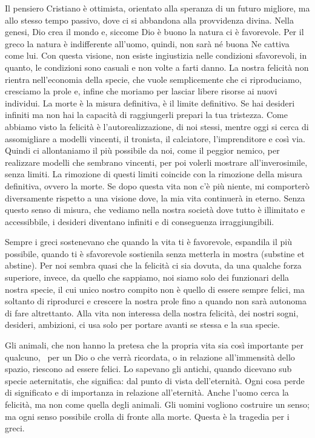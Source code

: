 \documentclass[12pt]{book} %
\begin{document}
Il pensiero Cristiano è ottimista, orientato alla speranza di un futuro migliore, ma allo stesso tempo passivo, dove ci
si abbandona alla provvidenza divina. Nella genesi, Dio crea il mondo e, siccome Dio è buono la natura ci è favorevole.
Per il greco la natura è indifferente all'uomo, quindi, non sarà né buona Ne cattiva come lui. Con questa visione, non
esiste ingiustizia nelle condizioni sfavorevoli, in quanto, le condizioni sono casuali e non volte a farti danno. La
nostra felicità non rientra nell'economia della specie, che vuole semplicemente che ci riproduciamo, cresciamo la prole
e, infine che moriamo per lasciar libere risorse ai nuovi individui. La morte è la misura definitiva, è il limite
definitivo. Se hai desideri infiniti ma non hai la capacità di raggiungerli prepari la tua tristezza. Come abbiamo
visto la felicità è l'autorealizzazione, di noi stessi, mentre oggi si cerca di assomigliare a
modelli vincenti, il tronista, il calciatore, l'imprenditore e così via. Quindi ci allontaniamo il
più possibile da noi, come il peggior nemico, per realizzare modelli che sembrano vincenti, per poi volerli mostrare
all'inverosimile, senza limiti. La rimozione di questi limiti coincide con la rimozione della misura definitiva, ovvero
la morte. Se dopo questa vita non c'è più niente, mi comporterò diversamente rispetto a una
visione dove, la mia vita continuerà in eterno. Senza questo senso di misura, che vediamo nella nostra società dove
tutto è illimitato e accessibbile, i desideri diventano infiniti e di conseguenza irraggiungibili.


\bigskip

Sempre i greci sostenevano che quando la vita ti è favorevole, espandila il più possibile, quando ti è sfavorevole
sostienila senza metterla in mostra (substine et abstine). Per noi sembra quasi che la felicità ci sia dovuta, da una
qualche forza superiore, invece, da quello che sappiamo, noi siamo solo dei funzionari della nostra specie, il cui
unico nostro compito non è quello di essere sempre felici, ma soltanto di riprodurci e crescere la nostra prole fino a
quando non sarà autonoma di fare altrettanto. Alla vita non interessa della nostra felicità, dei nostri sogni,
desideri, ambizioni, ci usa solo per portare avanti se stessa e la sua specie.

Gli animali, che non hanno la pretesa che la propria vita sia così importante per qualcuno, \ per un Dio o che verrà
ricordata, o in relazione all'immensità dello spazio, riescono ad essere felici. Lo sapevano gli
antichi, quando dicevano sub specie aeternitatis, che significa: dal punto di vista dell'eternità. Ogni cosa perde di
significato e di importanza in relazione all'eternità. Anche l'uomo cerca la felicità, ma non come quella degli
animali. Gli uomini vogliono costruire un senso; ma ogni senso possibile crolla di fronte alla morte. Questa è la
tragedia per i greci.
\end{document}
